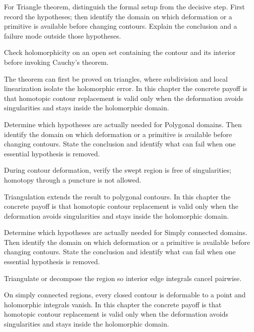 \begin{exercise}\label{exr:iv05-01}
For Triangle theorem, distinguish the formal setup from the decisive step. First record the hypotheses; then identify the domain on which deformation or a primitive is available before changing contours. Explain the conclusion and a failure mode outside those hypotheses.
\end{exercise}
\begin{hint}
Check holomorphicity on an open set containing the contour and its interior before invoking Cauchy's theorem.
\end{hint}
\begin{solution}
The theorem can first be proved on triangles, where subdivision and local linearization isolate the holomorphic error. In this chapter the concrete payoff is that homotopic contour replacement is valid only when the deformation avoids singularities and stays inside the holomorphic domain.
\end{solution}

\begin{exercise}\label{exr:iv05-02}
Determine which hypotheses are actually needed for Polygonal domains. Then identify the domain on which deformation or a primitive is available before changing contours. State the conclusion and identify what can fail when one essential hypothesis is removed.
\end{exercise}
\begin{hint}
During contour deformation, verify the swept region is free of singularities; homotopy through a puncture is not allowed.
\end{hint}
\begin{solution}
Triangulation extends the result to polygonal contours. In this chapter the concrete payoff is that homotopic contour replacement is valid only when the deformation avoids singularities and stays inside the holomorphic domain.
\end{solution}

\begin{exercise}\label{exr:iv05-03}
Determine which hypotheses are actually needed for Simply connected domains. Then identify the domain on which deformation or a primitive is available before changing contours. State the conclusion and identify what can fail when one essential hypothesis is removed.
\end{exercise}
\begin{hint}
Triangulate or decompose the region so interior edge integrals cancel pairwise.
\end{hint}
\begin{solution}
On simply connected regions, every closed contour is deformable to a point and holomorphic integrals vanish. In this chapter the concrete payoff is that homotopic contour replacement is valid only when the deformation avoids singularities and stays inside the holomorphic domain.
\end{solution}

